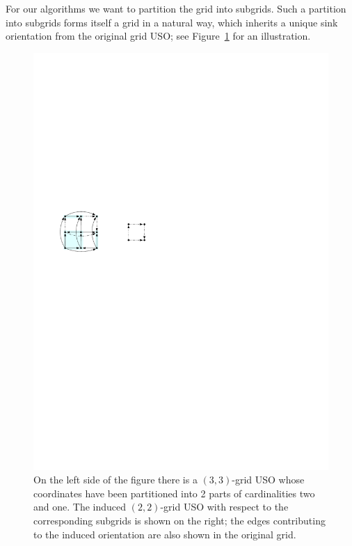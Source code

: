 \documentclass[runningheads,a4paper]{llncs}
\begin{document}
For our algorithms we want to partition the grid into subgrids.
Such a partition into subgrids forms itself a grid in a natural way,
which inherits a unique sink orientation from the original grid USO; see Figure~\ref{fig:example_induced_orientation} for an illustration.
\vspace{-.2in}
  \begin{figure}[htbp] 
  	\centering
  	\includegraphics[scale=1]{induced_orientation_ex.pdf}
  	\caption{\small On the left side of the figure there is a $(3,3)$-grid USO whose %
  	coordinates have been partitioned into 2 parts of cardinalities two and one. The induced $(2,2)$-grid USO with respect to the corresponding subgrids is shown on the right; the edges contributing to the induced orientation are also shown in the original grid.} 
  	\label{fig:example_induced_orientation}
  \end{figure}
\end{document}
